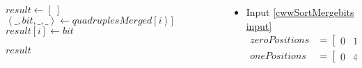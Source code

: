 \begin{frame}[containsverbatim]{\cwwalgortihmexampleframe}
\begin{columns}[c]
\begin{column}{0.35\textwidth}
{\begin{minipage}[c]{\textwidth}
\begin{algorithm}[H]
\begin{algorithmic}[1]
                                            \State $result \gets \left[\ \right]$
                                                \State $\left<\_, bit, \_, \_\right> \gets quadruplesMerged{\left[i\right>]}$
                                                \State $result{\left[i\right]} \gets bit$
                                            \EndFor
                                            \label{cwwSortMergebits after result}
                
                                            \State \Return $result$
                                        \EndFunction
                                    \end{algorithmic}
                                \end{algorithm}
                            \endgroup
                        \end{minipage}
                    }
                \end{column}

                \begin{column}{0.65\textwidth}
                    \vspace{-0.2cm}
                    \tiny
                    \begin{multicols}{2}
                        \begin{itemize}
                            \item Input \cref{cwwSortMergebits input}
                            \begin{align*}
                                zeroPositions & = \begin{bmatrix}0 & 1 & 2 & 3 & 4\end{bmatrix} \\
                                onePositions & = \begin{bmatrix}0 & 4 & 6 & 8\end{bmatrix}
                            \end{align*}


\end{itemize}
\end{multicols}
\end{column}
\end{columns}
\end{frame}

